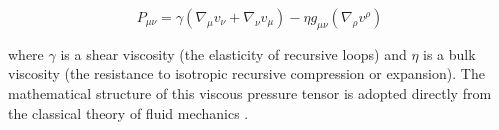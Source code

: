 \begin{equation}
P_{\mu\nu} = \gamma(\nabla_\mu v_\nu + \nabla_\nu v_\mu) - \eta g_{\mu\nu} (\nabla_\rho v^\rho)
\end{equation}

where \(\gamma\) is a shear viscosity (the elasticity of recursive loops) and \(\eta\) is a bulk viscosity (the resistance to isotropic recursive compression or expansion). The mathematical structure of this viscous pressure tensor is adopted directly from the classical theory of fluid mechanics \autocite{LandauLifshitz1987}.
